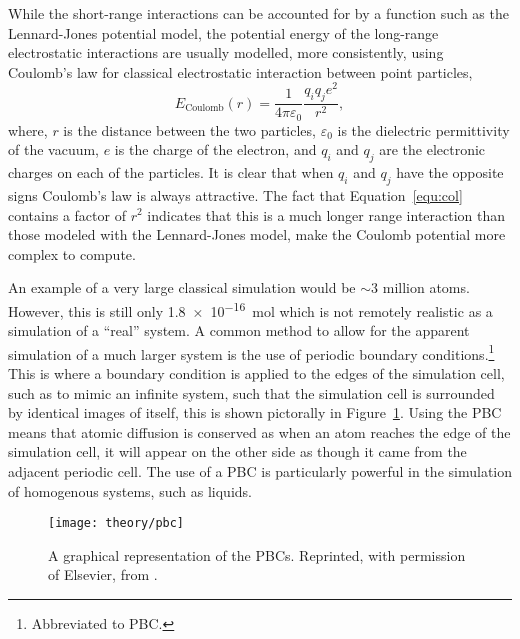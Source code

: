 While the short-range interactions can be accounted for by a function such as the Lennard-Jones potential model, the potential energy of the long-range electrostatic interactions are usually modelled, more consistently, using Coulomb's law for classical electrostatic interaction between point particles,\autocite{coulomb_premier_1788, coulomb_second_1788}
%
\begin{equation}
  E_{\text{Coulomb}}(r) = \frac{1}{4\pi\varepsilon_0}{\frac{q_iq_je^2}{r^2}},
  \label{equ:col}
\end{equation}
%
where, $r$ is the distance between the two particles, $\varepsilon_0$ is the dielectric permittivity of the vacuum, $e$ is the charge of the electron, and $q_i$ and $q_j$ are the electronic charges on each of the particles.
It is clear that when $q_i$ and $q_j$ have the opposite signs Coulomb's law is always attractive.
The fact that Equation~\ref{equ:col} contains a factor of $r^2$ indicates that this is a much longer range interaction than those modeled with the Lennard-Jones model, make the Coulomb potential more complex to compute.\autocite{frenkel_understanding_1996}

An example of a very large classical simulation would be $\sim3$ million atoms.\autocite{gumbart_regulation_2009}
However, this is still only \SI{1.8e-16}{\mol} which is not remotely realistic as a simulation of a ``real'' system.
A common method to allow for the apparent simulation of a much larger system is the use of periodic boundary conditions.\footnote{Abbreviated to PBC.}
This is where a boundary condition is applied to the edges of the simulation cell, such as to mimic an infinite system, such that the simulation cell is surrounded by identical images of itself, this is shown pictorally in Figure~\ref{fig:pbc}.
Using the PBC means that atomic diffusion is conserved as when an atom reaches the edge of the simulation cell, it will appear on the other side as though it came from the adjacent periodic cell.
The use of a PBC is particularly powerful in the simulation of homogenous systems, such as liquids.
%
\begin{figure}
    \centering
    \texttt{[image: theory/pbc]}
    \caption{A graphical representation of the PBCs. Reprinted, with permission of Elsevier, from \cite{frenkel_understanding_1996}.}
    \label{fig:pbc}
\end{figure}
%

